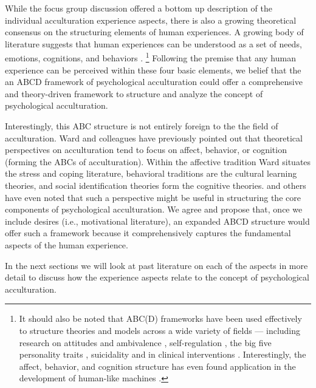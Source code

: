 \documentclass[nobib]{tufte-handout}
\begin{document}
While the focus group discussion offered a bottom up description of the individual acculturation experience aspects, there is also a growing theoretical consensus on the structuring elements of human experiences. A growing body of literature suggests that human experiences can be understood as a set of needs, emotions, cognitions, and behaviors \citep[sometimes referred to as the ABCs or ABCDs of psychology: affect, behavior, cognition, desire; e.g.,][]{Cottam2010, Hogg2005, Jhangiani2014}. \footnote{It should also be noted that ABC(D) frameworks have been used effectively to structure theories and models across a wide variety of fields --- including research on attitudes \citep{Breckler1984} and ambivalence \citep{VanHarreveld2015}, self-regulation \citep{Ben-Eliyahu2015}, the big five personality traits \citep{Wilt2016}, suicidality \citep{Harris2015} and in clinical interventions \citep{Eifert1989}. Interestingly, the affect, behavior, and cognition structure has even found application in the development of human-like machines \citep{Guo2020}.} Following the premise that any human experience can be perceived within these four basic elements, we belief that the an ABCD framework of psychological acculturation could offer a comprehensive and theory-driven framework to structure and analyze the concept of psychological acculturation.

Interestingly, this ABC structure is not entirely foreign to the the field of acculturation. Ward and colleagues \citep{Ward2001, Masgoret2006, Ward2019} have previously pointed out that theoretical perspectives on acculturation tend to focus on affect, behavior, or cognition (forming the ABCs of acculturation). Within the affective tradition Ward situates the stress and coping literature, behavioral traditions are the cultural learning theories, and social identification theories form the cognitive theories. \citet{Sam2006b} and others have even noted that such a perspective might be useful in structuring the core components of psychological acculturation. We agree and propose that, once we include desires (i.e., motivational literature), an expanded ABCD structure would offer such a framework because it comprehensively captures the fundamental aspects of the human experience. 

In the next sections we will look at past literature on each of the aspects in more detail to discuss how the experience aspects relate to the concept of psychological acculturation. 
\end{document}
